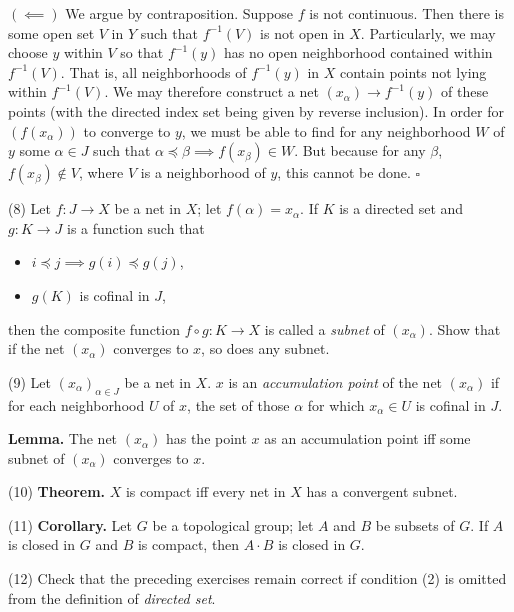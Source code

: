 \documentclass[a4paper]{article}
\begin{document}
$(\impliedby)$ We argue by contraposition. Suppose $f$ is not continuous. Then there is some open set $V$ in $Y$ such that $f^{-1}(V)$ is not open in $X$. Particularly, we may choose $y$ within $V$ so that $f^{-1}(y)$ has no open neighborhood contained within $f^{-1}(V)$. That is, all neighborhoods of $f^{-1}(y)$ in $X$ contain points not lying within $f^{-1}(V)$. We may therefore construct a net $(x_\alpha) \to f^{-1}(y)$ of these points (with the directed index set being given by reverse inclusion). In order for $(f(x_\alpha))$ to converge to $y$, we must be able to find for any neighborhood $W$ of $y$ some $\alpha \in J$ such that $\alpha \preceq \beta \implies f(x_\beta) \in W$. But because for any $\beta$, $f(x_\beta) \notin V$, where $V$ is a neighborhood of $y$, this cannot be done. $\square$

\vspace{0.5cm}

(8) Let $f : J \to X$ be a net in $X$; let $f(\alpha) = x_\alpha$. If $K$ is a directed set and $g : K \to J$ is a function such that

\begin{itemize}
    \item $i \preceq j \implies g(i) \preceq g(j)$,
    \item $g(K)$ is cofinal in $J$,
\end{itemize}

then the composite function $f \circ g : K \to X$ is called a \emph{subnet} of $(x_\alpha)$. Show that if the net $(x_\alpha)$ converges to $x$, so does any subnet.

(9) Let $(x_\alpha)_{\alpha \in J}$ be a net in $X$. $x$ is an \emph{accumulation point} of the net $(x_\alpha)$ if for each neighborhood $U$ of $x$, the set of those $\alpha$ for which $x_\alpha \in U$ is cofinal in $J$.

\textbf{Lemma.} The net $(x_\alpha)$ has the point $x$ as an accumulation point iff some subnet of $(x_\alpha)$ converges to $x$.

(10) \textbf{Theorem.} $X$ is compact iff every net in $X$ has a convergent subnet.

(11) \textbf{Corollary.} Let $G$ be a topological group; let $A$ and $B$ be subsets of $G$. If $A$ is closed in $G$ and $B$ is compact, then $A \cdot B$ is closed in $G$.

(12) Check that the preceding exercises remain correct if condition (2) is omitted from the definition of \emph{directed set}.
\end{document}
